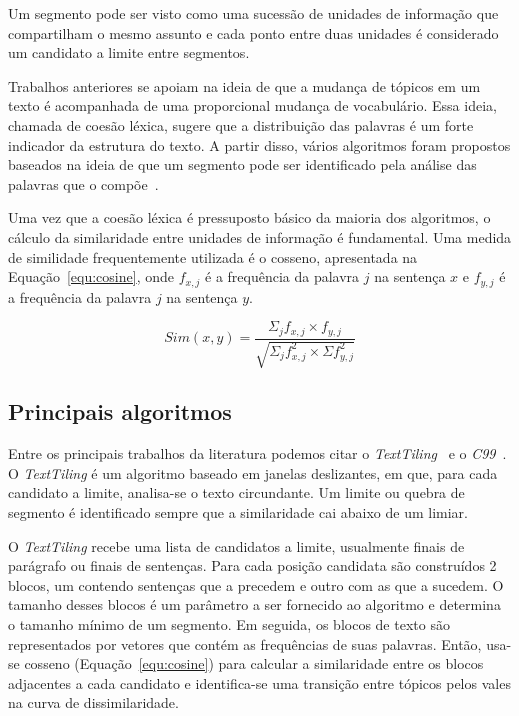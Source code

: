 

Um segmento pode ser visto como uma sucessão de unidades de informação que compartilham o mesmo assunto e cada ponto entre duas unidades é considerado um candidato a limite entre segmentos.


Trabalhos anteriores se apoiam na ideia de que a mudança de tópicos em um texto é acompanhada de uma proporcional mudança de vocabulário. Essa ideia, chamada de coesão léxica, sugere que a distribuição das palavras é um forte indicador da estrutura do texto. A partir disso, vários algoritmos foram propostos baseados na ideia de que um segmento pode ser identificado pela análise das palavras que o compõe~\cite{Chen2017,Ferret2009,Sakahara2014}.


Uma vez que a coesão léxica é pressuposto básico da maioria dos algoritmos, o cálculo da similaridade entre unidades de informação é fundamental. Uma medida de similidade frequentemente utilizada é o cosseno, apresentada na Equação~\ref{equ:cosine}, onde $f_{x,j}$ é a frequência da palavra $j$ na sentença $x$ e $f_{y,j}$ é a frequência da palavra $j$ na sentença $y$.
				

\begin{equation}
Sim(x,y) = \frac
{\Sigma_j f_{x,j} \times f_{y,j}}
{\sqrt{\Sigma_j f^2_{x,j} \times \Sigma f^2_{y,j}}}
\label{equ:cosine}
\end{equation}


\subsection{Principais algoritmos}
	\label{subsec:principaisalgoritimos}

Entre os principais trabalhos da literatura podemos citar o  \textit{TextTiling}~\cite{Hearst1994} e o \textit{C99}~\cite{Choi2000}.
%
O \textit{TextTiling} é um algoritmo baseado em janelas deslizantes, em  que, para cada candidato a limite, analisa-se o texto circundante. Um limite ou quebra de segmento é identificado sempre que a similaridade cai abaixo de um limiar.

O \textit{TextTiling} recebe uma lista de candidatos a limite, usualmente finais de parágrafo ou finais de sentenças. Para cada posição candidata são construídos 2 blocos, um contendo sentenças que a precedem e outro com as que a sucedem. O tamanho desses blocos é um parâmetro a ser fornecido ao algoritmo e determina o tamanho mínimo de um segmento.
%
Em seguida, os blocos de texto são representados por vetores que contém as frequências de suas palavras. Então, usa-se cosseno (Equação~\ref{equ:cosine}) para calcular a similaridade entre os blocos adjacentes a cada candidato e identifica-se uma transição entre tópicos pelos vales na curva de dissimilaridade.

